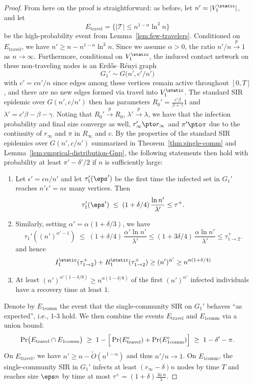 \documentclass[11pt]{article}
\begin{document}
\begin{proof}
From here on the proof is straightforward: as before, let $n' = |V_1^{\static}|$, and let 
\[
   E_{\mathrm{travel}} =\big\{|\mathcal{T}| \le 
  n^{1-\alpha} \ln^3 n \big\}
\]
be the high-probability event from Lemma~\ref{lem:few-travelers}. 
Conditioned on $ E_{\mathrm{travel}}$, we have $n' \ge n - n^{1-\alpha} \ln^3 n$. Since we assume $\alpha > 0$, the ratio $n'/n \overset{p}{\to} 1$ as $n\to\infty$. Furthermore, conditional on $V_1^{\static}$, the induced contact network on these non-traveling nodes is an Erd\H{o}s--R\'{e}nyi graph
\[
   G_1' \sim G\bigl(n', c'/n'\bigr)
\]
with $c' = cn'/n$
since edges among these vertices remain active throughout $[0,T]$, and there are no new edges formed via travel into $V_1^{\static}$.
The standard SIR epidemic over $G(n', c/n')$ then has parameters $R_0' = \frac{c'\beta}{\beta + \gamma}1$ and
$\lambda' = c'\beta - \beta - \gamma$.
Noting that $R_0'\overset{p}{\to} R_0$, 
$\lambda'\overset{p}{\to} \lambda$, we have that the infection probability and final size converge as well,
$r_\infty'\pto r_\infty$ and $ \pi'\pto \pi$ due to the continuity of $r_\infty$ and $\pi$ in $R_\infty$ and $c$.
By the properties of the standard SIR epidemics over $G(n', c/n')$
summarized in Theorem~\ref{thm:single-comm} and Lemma~\ref{lem:emprical-distribution-Gnp}, the following statements then hold with probability at least $\pi' - \delta'/2$ if $n$ is sufficiently large:
\begin{enumerate}
      \item  Let 
$\epsilon'=\epsilon n/n'$ and let      
    $\tau_1'(\eps')$ be the first time the infected set in $G_1'$ reaches $n'\epsilon'=n\epsilon$ many vertices.  Then
    \[
      \tau_1'(\eps') \;\le\; (1+\delta/4)\,\frac{\ln n'}{\lambda'}\leq \tau^+.
    \]
\item Similarly, setting $\alpha'=\alpha (1+\delta/3)$, we have
  \[
      \tau_1'((n')^{\alpha'-1}) \;\le\;  (1+\delta/4)\,\frac{\alpha'\ln n'}{\lambda'}\leq  (1+3\delta/4)\,\frac{\alpha\ln n'}{\lambda'}
     \leq \tau^+_{1\to 2} .
    \]
and  hence
\[ I_1^{\static}(\tau^+_{1\to 2} )+R_1^{\static}(\tau^+_{1\to 2} )\geq (n')^{\alpha'}\geq
n^{\alpha(1+\delta/4)}\]
\item At least $(n')^{\alpha'(1-\delta/8)}\geq n^{\alpha(1-\delta/8)}$
of the first $(n')^{\alpha'}$ infected individuals have a recovery time at least $1$.
\end{enumerate}
Denote by $E_{\mathrm{1comm}}$ the event that the single-community SIR on $G_1'$ behaves ``as expected'', i.e., 1-3 hold.
We then combine the events $E_{\mathrm{travel}}$ and $E_{\mathrm{1comm}}$ via a union bound:
\[
  \Pr\bigl(E_{\mathrm{travel}} \cap E_{\mathrm{1comm}}\bigr) 
    \;\ge\; 1 - \Bigl[\,\Pr(E_{\mathrm{travel}}^c) + \Pr(E_{\mathrm{1comm}}^c)\Bigr]
    \;\ge\; 1 - \delta'-\pi.\]
On $E_{\mathrm{travel}}$, we have $n' \ge n 
-\tilde O(n^{1-\alpha})$ and thus $n'/n \to 1$. On $E_{\mathrm{1comm}}$, the single-community SIR in $G_1'$ infects at least $( r_\infty-\delta)n$ nodes by time $T$ and reaches size $\eps n$ by time at most $ \tau^+=(1+\delta)\frac{\ln n}{\lambda}$.


\end{proof}
\end{document}
